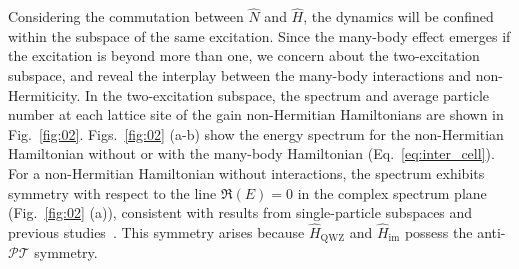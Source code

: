 \documentclass[longbibliography, aps, prx, amsmath, amssymb, amsfonts, twocolumn,superscriptaddress, footinbib]{revtex4-1}
\begin{document}
	
	Considering the commutation between $\hat{N}$ and $\hat{H}$, the dynamics will be confined within the subspace of the same excitation. Since the many-body effect emerges if the excitation is beyond more than one, we concern about the two-excitation subspace, and reveal the interplay between the many-body interactions and non-Hermiticity. 
	In the two-excitation subspace, the spectrum and average particle number at each lattice site of the gain non-Hermitian Hamiltonians 
	are shown in Fig.~\ref{fig:02}.
	Figs.~\ref{fig:02} (a-b) show the energy spectrum
	for the non-Hermitian Hamiltonian without or with the many-body Hamiltonian (Eq.~\ref{eq:inter_cell}). 
    For a non-Hermitian Hamiltonian without interactions, the spectrum exhibits symmetry with respect to the line $\Re(E)=0$ in the complex spectrum plane (Fig.~\ref{fig:02} (a)), consistent with results from single-particle subspaces and previous studies~\cite{nakamura2023universal, ma2024non,schindler2023hermitian}. This symmetry arises because $\hat{H}_{\text{QWZ}}$ and $\hat{H}_{\text{im}}$ possess the anti-$\mathcal{PT}$ symmetry.
\end{document}
